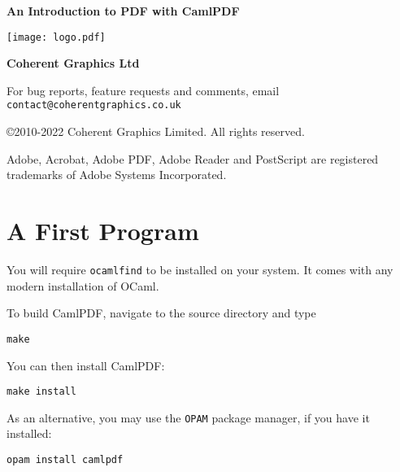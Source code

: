 \documentclass[a4paper]{memoir}
\newcommand{\smallgap}{\vspace{4mm}}
\begin{document}
\frontmatter
\thispagestyle{empty}

\begin{flushright}

{\sffamily \bfseries \Huge An Introduction to PDF with CamlPDF}


\vfill

\texttt{[image: logo.pdf]}

\vspace{2mm}
{\sffamily \bfseries \LARGE Coherent Graphics Ltd}

\end{flushright}

\clearpage

\thispagestyle{empty}
\noindent For bug reports, feature requests and comments, email\\ \texttt{contact@coherentgraphics.co.uk}

\vspace*{\fill}
\noindent\copyright 2010-2022 Coherent Graphics Limited. All rights reserved.

\smallgap 
\noindent Adobe, Acrobat, Adobe PDF, Adobe Reader and PostScript are
registered trademarks of Adobe Systems Incorporated.

\cleardoublepage

\mainmatter

\pagestyle{ruled}
\section*{A First Program}
You will require \texttt{ocamlfind} to be installed on your system. It comes with any modern installation of OCaml.

To build \textsf{CamlPDF}, navigate to the source directory and type
\begin{framed}
\verb!make!
\end{framed}

\noindent You can then install \textsf{CamlPDF}:
\begin{framed}
\verb!make install!
\end{framed}

\noindent As an alternative, you may use the \texttt{OPAM} package manager, if you have it installed:
\begin{framed}
\verb!opam install camlpdf!
\end{framed}
\end{document}
